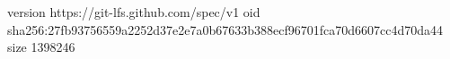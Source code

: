 version https://git-lfs.github.com/spec/v1
oid sha256:27fb93756559a2252d37e2e7a0b67633b388ecf96701fca70d6607cc4d70da44
size 1398246
